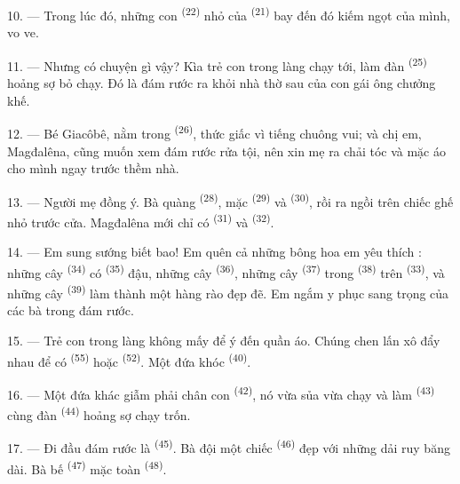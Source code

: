 10. --- Trong lúc đó, những con  \textsuperscript{(22)} nhỏ của  \textsuperscript{(21)} bay đến đó kiếm  ngọt của mình, vo ve.

11. --- Nhưng có chuyện gì vậy? Kìa trẻ con trong làng chạy tới, làm đàn 
\textsuperscript{(25)} hoảng sợ bỏ chạy. Đó là đám rước ra khỏi nhà thờ sau  của con gái ông chưởng khế.

12. --- Bé Giacôbê, nằm trong  \textsuperscript{(26)}, thức giấc vì tiếng
chuông vui; và chị em, Magđalêna, cũng muốn xem đám rước rửa tội, nên xin mẹ ra chải tóc
và mặc áo cho mình ngay trước thềm nhà.

13. --- Người mẹ đồng ý. Bà quàng  \textsuperscript{(28)}, mặc  \textsuperscript{(29)} và  \textsuperscript{(30)}, rồi ra ngồi
trên chiếc ghế nhỏ trước cửa. Magđalêna mới chỉ có 
\textsuperscript{(31)} và  \textsuperscript{(32)}.

14. --- Em sung sướng biết bao! Em quên cả những bông hoa em yêu thích : những cây
 \textsuperscript{(34)} có  \textsuperscript{(35)} đậu,
những cây  \textsuperscript{(36)}, những cây 
\textsuperscript{(37)} trong  \textsuperscript{(38)} trên  \textsuperscript{(33)}, và những cây  \textsuperscript{(39)} làm
thành một hàng rào đẹp đẽ. Em ngắm y phục sang trọng của các bà trong đám rước.

15. --- Trẻ con trong làng không mấy để ý đến quần áo. Chúng chen lấn xô đẩy nhau để có
 \textsuperscript{(55)} hoặc  \textsuperscript{(52)}. Một
đứa khóc \textsuperscript{(40)}.

16. --- Một đứa khác giẫm phải chân con  \textsuperscript{(42)}, nó vừa sủa
vừa chạy và làm  \textsuperscript{(43)} cùng đàn 
\textsuperscript{(44)} hoảng sợ chạy trốn.

\VUsaut{5.0mm}
\VUsaut{4.0mm}

17. --- Đi đầu đám rước là  \textsuperscript{(45)}. Bà đội một chiếc
 \textsuperscript{(46)} đẹp với những dải ruy băng dài. Bà bế
 \textsuperscript{(47)} mặc toàn 
\textsuperscript{(48)}.

